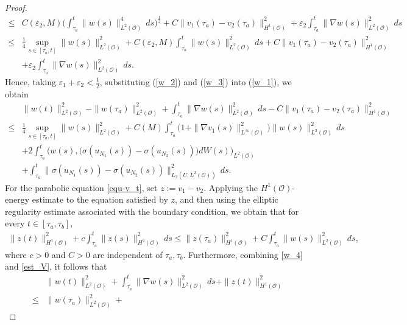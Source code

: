 \documentclass[reqno, 11pt]{amsart}
\theoremstyle{definition}
\numberwithin{equation}{section} \numberwithin{lem}{section}
\numberwithin{thm}{section} \numberwithin{prop}{section}
\numberwithin{cor}{section} \numberwithin{rem}{section}
\numberwithin{defn}{section}
\begin{document}
\begin{proof}
\begin{align}
  \nonumber
    \le & C(\varepsilon_2,M)\Big(\int_{\tau_a}^t\|w(s)\|_{L^2(\mathcal {O})}^4\,ds\Big)^\frac{1}{2}+C\|v_1(\tau_a)-v_2(\tau_a)\|_{H^1(\mathcal{O})}^2+\varepsilon_2\int_{\tau_a}^t\|\nabla w(s)\|_{L^2(\mathcal {O})}^2\,ds\\\nonumber 
    \le &\frac{1}{4}\sup_{s\in[{\tau_a},t]}\|w(s)\|_{L^2(\mathcal {O})}^2+C(\varepsilon_2,M)\int_{\tau_a}^t\| w(s)\|_{L^2(\mathcal {O})}^2\,ds+C\|v_1(\tau_a)-v_2(\tau_a)\|_{H^1(\mathcal{O})}^2\\&+\varepsilon_2\int_{\tau_a}^t\|\nabla w(s)\|_{L^2(\mathcal {O})}^2\,ds.
\end{align}
Hence, taking $\varepsilon_1+\varepsilon_2<\frac{1}{2}$, substituting (\ref{w_2}) and (\ref{w_3}) into (\ref{w_1}), we obtain
\begin{align}\label{w_4}
   \nonumber &\|w(t)\|_{L^2(\mathcal {O})}^2-\|w({\tau_a})\|_{L^2(\mathcal {O})}^2+\int_{\tau_a}^t\|\nabla w(s)\|_{L^2(\mathcal {O})}^2\,ds-C\|v_1(\tau_a)-v_2(\tau_a)\|_{H^1(\mathcal{O})}^2\\\nonumber
   \leq&\frac{1}{4}\sup_{s\in[{\tau_a},t]}\|w(s)\|_{L^2(\mathcal {O})}^2+C(M)\int_{\tau_a}^t\big(1+\|\nabla v_1(s)\|_{L^\infty(\mathcal {O})}^2\big)\| w(s)\|_{L^2(\mathcal {O})}^2\,ds\\\nonumber&+2\int_{\tau_a}^t\big(w(s),\big(\sigma({u_{N_1}(s)})-\sigma({u_{N_2}(s)})\big)dW(s)\big)_{L^2(\mathcal {O})}\\&+\int_{\tau_a}^t
\big\|\sigma({u_{N_1}(s)})-\sigma({u_{N_2}(s)}) \big\|_{L_2(U,L^2(\mathcal O))}^2\,ds.
\end{align}
For the parabolic equation \eqref{equ-v_t}, set $z:=v_1-v_2$.
Applying the $H^1(\mathcal{O})$-energy estimate to the equation satisfied by $z$, and then using the elliptic regularity estimate associated
with the boundary condition,
we obtain that for every \(t\in[\tau_a,\tau_b]\),
\begin{align}\label{est_V}
\|z(t)\|_{H^1(\mathcal O)}^2
+
c\int_{\tau_a}^{t}
\|z(s)\|_{H^2(\mathcal O)}^2\,ds
\leq
\|z(\tau_a)\|_{H^1(\mathcal O)}^2
+
C\int_{\tau_a}^{t}
\|w(s)\|_{L^2(\mathcal O)}^2\,ds,
\end{align}
where \(c>0\) and \(C>0\) are independent of
\(\tau_a,\tau_b\). Furthermore, combining \eqref{w_4} and \eqref{est_V},  it follows that
\begin{align}\label{w_6}
  \nonumber& \|w(t)\|_{L^2(\mathcal {O})}^2+\int_{\tau_a}^t\|\nabla w(s)\|_{L^2(\mathcal {O})}^2\,ds+\|z(t)\|_{H^1(\mathcal O)}^2\\ \nonumber
\leq&\|w({\tau_a})\|_{L^2(\mathcal {O})}^2+

\end{align}
\end{proof}
\end{document}
